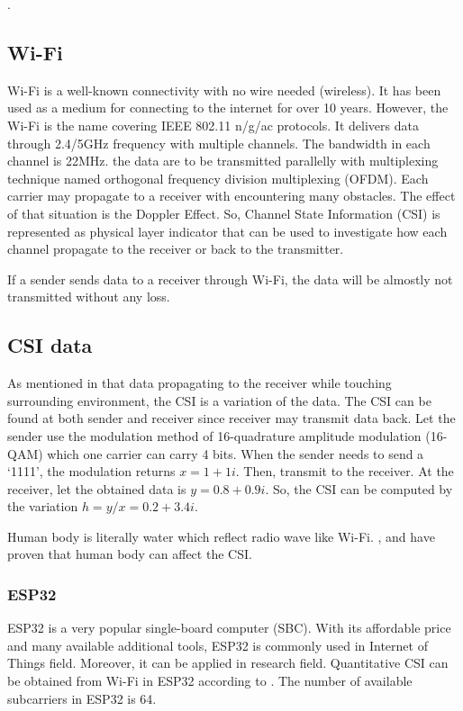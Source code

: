 \documentclass[10pt,letterpaper]{article}
\begin{document}
	.
	
	
	\subsection*{Wi-Fi}\label{wifi}
	
	Wi-Fi is a well-known connectivity with no wire needed (wireless). It has been used as a medium for connecting to the internet for over 10 years. However, the Wi-Fi is the name covering IEEE 802.11 n/g/ac protocols. It delivers data through 2.4/5GHz frequency with multiple channels. The bandwidth in each channel is 22MHz. the data are to be transmitted  parallelly with multiplexing technique named orthogonal frequency division multiplexing (OFDM). Each carrier may propagate to a receiver with encountering many obstacles. The effect of that situation is the Doppler Effect.
	So, Channel State Information (CSI) is represented as physical layer indicator that can be used to investigate how each channel propagate to the receiver or back to the transmitter.
	
	If a sender sends data to a receiver through Wi-Fi, the data will be almostly not transmitted without any loss.
	
	
	
	\subsection*{CSI data}\label{CSI}
	As mentioned in  that data propagating to the receiver while touching surrounding environment, the CSI is a variation of the data. The CSI can  be found at both sender and receiver since receiver may transmit data back. Let the sender use the modulation method of 16-quadrature amplitude modulation (16-QAM) which one carrier can carry 4 bits. When the sender needs to send a `1111', the modulation returns $x=1+1i$. Then, transmit to the receiver. At the receiver, let the obtained data is $y=0.8+0.9i$. So, the CSI can be computed by the variation $h=y/x=0.2+3.4i$.
	
	Human body is literally water which reflect radio wave like Wi-Fi. \cite{wangF}, \cite{liuJ} and \cite{chowdhuryTZ} have proven that human body can affect the CSI.
	
	\subsubsection*{ESP32}\label{ESP32}
	ESP32 is a very popular single-board computer (SBC). With its affordable price and many available additional tools, ESP32 is commonly used in Internet of Things field. Moreover, it can be applied in research field. Quantitative CSI can be obtained from Wi-Fi in ESP32 according to \cite{atifM}. The number of available subcarriers in ESP32 is 64.
	
\end{document}
